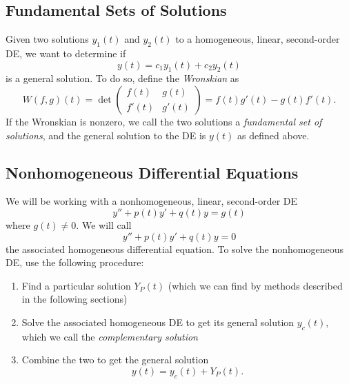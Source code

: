 \documentclass[12pt]{article}
\theoremstyle{definition}
\begin{document}
\subsection{Fundamental Sets of Solutions}
Given two solutions $y_1(t)$ and $y_2(t)$ to a homogeneous, linear, second-order DE, we want to determine if \begin{equation*}
	y(t) = c_1y_1(t) + c_2y_2(t)
\end{equation*}
is a general solution.
To do so, define the \textit{Wronskian} as \begin{equation*}
	W(f, g)(t) = \det \begin{pmatrix} f(t) & g(t) \\ f'(t) & g'(t)\end{pmatrix} = f(t)g'(t) - g(t)f'(t).
\end{equation*}
If the Wronskian is nonzero, we call the two solutions a \textit{fundamental set of solutions}, and the general solution to the DE is $y(t)$ as defined above.

\subsection{Nonhomogeneous Differential Equations}
We will be working with a nonhomogeneous, linear, second-order DE \begin{equation*}
	y'' + p(t)y' + q(t)y = g(t)
\end{equation*}
where $g(t) \neq 0$.
We will call \begin{equation*}
	y'' + p(t)y' + q(t)y = 0
\end{equation*}
the associated homogeneous differential equation.
To solve the nonhomogeneous DE, use the following procedure: \begin{enumerate}
	\item Find a particular solution $Y_P(t)$ (which we can find by methods described in the following sections)
	\item Solve the associated homogeneous DE to get its general solution $y_c(t)$, which we call the \textit{complementary solution}
	\item Combine the two to get the general solution \begin{equation*}
		      y(t) = y_c(t) + Y_P(t).
	      \end{equation*}
\end{enumerate}
\end{document}
